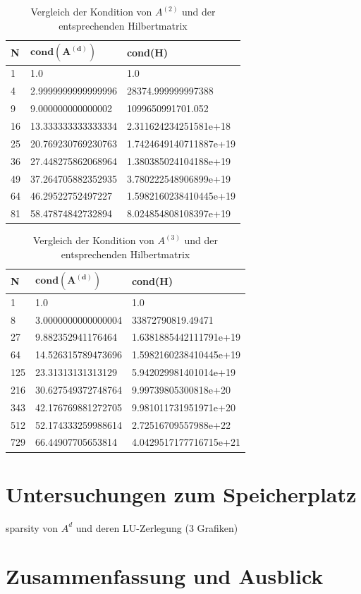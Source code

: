 \documentclass{scrartcl}
\begin{document}
\begin{table}[h!]
\centering
\begin{tabular}{|l|l|l|}
\hline
\textbf{N} & $\mathbf{cond(A^{(d)})}$  & \textbf{cond(H)}       \\ \hline
1          & 1.0                       & 1.0                    \\ \hline
4          & 2.9999999999999996        & 28374.999999997388     \\ \hline
9          & 9.000000000000002         & 1099650991701.052      \\ \hline
16         & 13.333333333333334        & 2.311624234251581e+18  \\ \hline
25         & 20.769230769230763        & 1.7424649140711887e+19 \\ \hline
36         & 27.448275862068964        & 1.380385024104188e+19  \\ \hline
49         & 37.264705882352935        & 3.780222548906899e+19  \\ \hline
64         & 46.29522752497227         & 1.5982160238410445e+19 \\ \hline
81         & 58.47874842732894         & 8.024854808108397e+19  \\ \hline
\end{tabular}
\caption{Vergleich der Kondition von $A^{(2)}$ und der entsprechenden Hilbertmatrix}
\end{table}


\begin{table}[h!]
\centering
\begin{tabular}{|l|l|l|}
\hline
\textbf{N} & $\mathbf{cond(A^{(d)})}$ & \textbf{cond(H)}       \\ \hline
1          & 1.0                       & 1.0                    \\ \hline
8          & 3.0000000000000004        & 33872790819.49471      \\ \hline
27         & 9.882352941176464         & 1.6381885442111791e+19 \\ \hline
64         & 14.526315789473696        & 1.5982160238410445e+19 \\ \hline
125        & 23.31313131313129         & 5.942029981401014e+19  \\ \hline
216        & 30.627549372748764        & 9.99739805300818e+20   \\ \hline
343        & 42.176769881272705        & 9.981011731951971e+20  \\ \hline
512        & 52.174333259988614        & 2.72516709557988e+22   \\ \hline
729        & 66.44907705653814         & 4.0429517177716715e+21 \\ \hline
\end{tabular}
\caption{Vergleich der Kondition von $A^{(3)}$ und der entsprechenden Hilbertmatrix}
\end{table}


\pagebreak
\section{Untersuchungen zum Speicherplatz}
sparsity von $A^d$ und deren LU-Zerlegung (3 Grafiken)

\pagebreak
\section{Zusammenfassung und Ausblick}


\pagebreak



\end{document}
